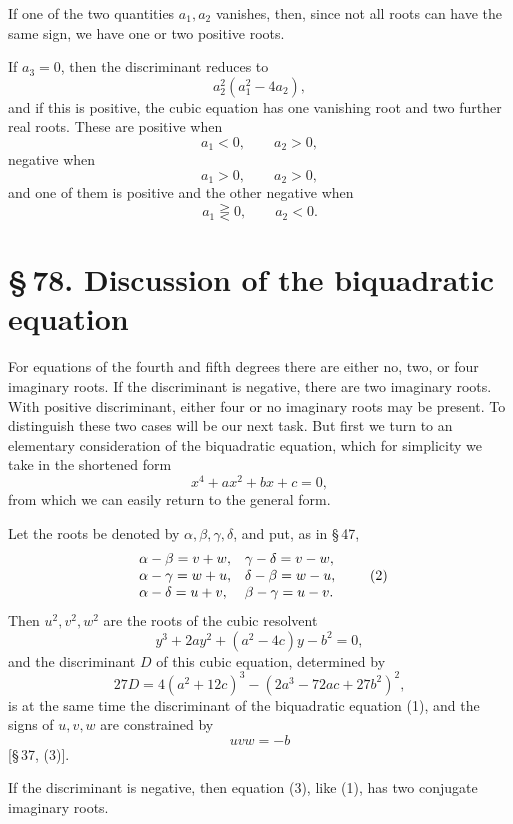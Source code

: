 \documentclass[11pt]{article}
\providecommand{\sect}[2]{\section*{\S\,#1. #2}}
\begin{document}
If one of the two quantities $a_1,a_2$ vanishes, then, since not all roots can have the same sign, we have one or two positive roots.

If $a_3=0$, then the discriminant reduces to
\[
        a_2^2(a_1^2-4a_2),
\]
and if this is positive, the cubic equation has one vanishing root and two further real roots. These are positive when
\[
        a_1<0,
        \qquad a_2>0,
\]
negative when
\[
        a_1>0,
        \qquad a_2>0,
\]
and one of them is positive and the other negative when
\[
        a_1\gtreqless 0,
        \qquad a_2<0.
\]

\sect{78}{Discussion of the biquadratic equation}

For equations of the fourth and fifth degrees there are either no, two, or four imaginary roots. If the discriminant is negative, there are two imaginary roots. With positive discriminant, either four or no imaginary roots may be present. To distinguish these two cases will be our next task. But first we turn to an elementary consideration of the biquadratic equation, which for simplicity we take in the shortened form
\begin{equation}
        x^4+ax^2+bx+c=0,
\tag{1}
\end{equation}
from which we can easily return to the general form.

Let the roots be denoted by $\alpha,\beta,\gamma,\delta$, and put, as in \S\,47,
\begin{equation}
\begin{array}{ll}
\alpha-\beta=v+w, & \gamma-\delta=v-w,\cr
\alpha-\gamma=w+u, & \delta-\beta=w-u,\cr
\alpha-\delta=u+v, & \beta-\gamma=u-v.
\end{array}
\tag{2}
\end{equation}
Then $u^2,v^2,w^2$ are the roots of the cubic resolvent
\begin{equation}
        y^3+2ay^2+(a^2-4c)y-b^2=0,
\tag{3}
\end{equation}
and the discriminant $D$ of this cubic equation, determined by
\begin{equation}
        27D=4(a^2+12c)^3-(2a^3-72ac+27b^2)^2,
\tag{4}
\end{equation}
is at the same time the discriminant of the biquadratic equation (1), and the signs of $u,v,w$ are constrained by
\begin{equation}
        uvw=-b
\tag{5}
\end{equation}
[\S\,37, (3)].

If the discriminant is negative, then equation (3), like (1), has two conjugate imaginary roots.
\end{document}
